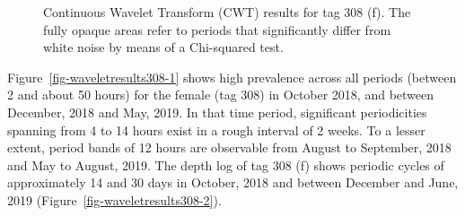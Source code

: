 \documentclass[
  authoryear,
  review,
  3p]{elsarticle}
\begin{document}
\begin{figure}

\begin{minipage}[t]{\linewidth}

{\centering 


}

\end{minipage}%
\newline
\begin{minipage}[t]{\linewidth}

{\centering 


}

\end{minipage}%

\caption{\label{fig-waveletresults308}Continuous Wavelet Transform (CWT)
results for tag 308 (f). The fully opaque areas refer to periods that
significantly differ from white noise by means of a Chi-squared test.}

\end{figure}

Figure~\ref{fig-waveletresults308-1} shows high prevalence across all
periods (between 2 and about 50 hours) for the female (tag 308) in
October 2018, and between December, 2018 and May, 2019. In that time
period, significant periodicities spanning from 4 to 14 hours exist in a
rough interval of 2 weeks. To a lesser extent, period bands of 12 hours
are observable from August to September, 2018 and May to August, 2019.
The depth log of tag 308 (f) shows periodic cycles of approximately 14
and 30 days in October, 2018 and between December and June, 2019
(Figure~\ref{fig-waveletresults308-2}).
\end{document}
